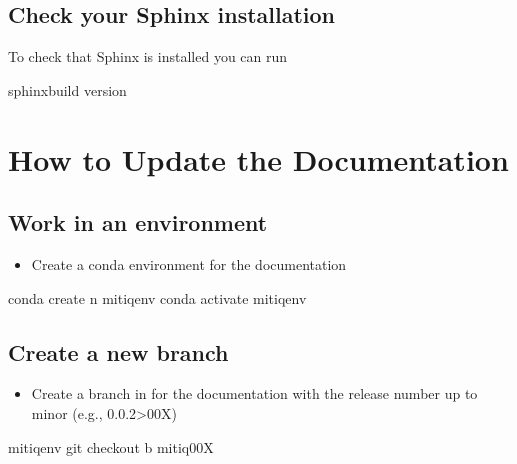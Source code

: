 \documentclass[letterpaper,10pt,english]{sphinxmanual}
\begin{document}
\subsection{Check your Sphinx installation}
\label{\detokenize{README-docs:check-your-sphinx-installation}}
To check that Sphinx is installed you can run

\begin{sphinxVerbatim}[commandchars=\\\{\}]
sphinx\PYGZhy{}build \PYGZhy{}\PYGZhy{}version
\end{sphinxVerbatim}


\section{How to Update the Documentation}
\label{\detokenize{README-docs:how-to-update-the-documentation}}

\subsection{Work in an environment}
\label{\detokenize{README-docs:work-in-an-environment}}\begin{itemize}
\item {} 
Create a conda environment for the documentation

\end{itemize}

\begin{sphinxVerbatim}[commandchars=\\\{\}]
conda create \PYGZhy{}n mitiqenv
conda activate mitiqenv
\end{sphinxVerbatim}


\subsection{Create a new branch}
\label{\detokenize{README-docs:create-a-new-branch}}\begin{itemize}
\item {} 
Create a branch in  for the documentation with the release number up to
minor (e.g., 0.0.2\sphinxhyphen{}\sphinxhyphen{}\sphinxhyphen{}\textgreater{}00X)

\end{itemize}

\begin{sphinxVerbatim}[commandchars=\\\{\}]
mitiqenv git checkout \PYGZhy{}b mitiq00X
\end{sphinxVerbatim}
\end{document}
